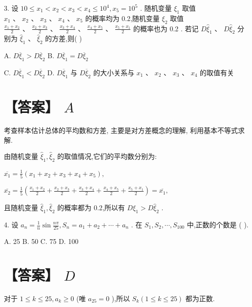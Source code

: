 \documentclass[10pt]{article}
\begin{document}
3. 设 \({10} \leq  {x}_{1} < {x}_{2} < {x}_{3} < {x}_{4} \leq  {10}^{4},{x}_{5} = {10}^{5}\) . 随机变量 \({\xi }_{1}\) 取值 \({x}_{1}\text{ 、 }{x}_{2}\text{ 、 }{x}_{3}\text{ 、 }{x}_{4}\text{ 、 }{x}_{5}\) 的概率均为 0.2,随机变量 \({\xi }_{2}\) 取值 \(\frac{{x}_{1} + {x}_{2}}{2}\text{ 、 }\frac{{x}_{2} + {x}_{3}}{2}\text{ 、 }\frac{{x}_{3} + {x}_{4}}{2}\text{ 、 }\frac{{x}_{4} + {x}_{5}}{2}\text{ 、 }\frac{{x}_{5} + {x}_{1}}{2}\) 的概率也为 0.2 . 若记 \(D{\widehat{\xi }}_{1}\text{ 、 }D{\widehat{\xi }}_{2}\) 分别为 \({\widehat{\xi }}_{1}\text{ 、 }{\widehat{\xi }}_{2}\) 的方差,则(   )

A. \(D{\overline{\xi }}_{1} > D{\overline{\xi }}_{2}\) B. \(D{\overline{\xi }}_{1} = D{\overline{\xi }}_{2}\)

C. \(D{\overline{\xi }}_{1} < D{\overline{\xi }}_{2}\) D. \(D{\overline{\xi }}_{1}\) 与 \(D{\overline{\xi }}_{2}\) 的大小关系与 \({x}_{1}\text{ 、 }{x}_{2}\text{ 、 }{x}_{3}\text{ 、 }{x}_{4}\) 的取值有关

\section*{【答案】 \(A\)}

考查样本估计总体的平均数和方差, 主要是对方差概念的理解, 利用基本不等式求解.

由随机变量 \({\widehat{\xi }}_{1},{\widehat{\xi }}_{2}\) 的取值情况,它们的平均数分别为:

\(\overline{{x}_{1}} = \frac{1}{5}\left( {{x}_{1} + {x}_{2} + {x}_{3} + {x}_{4} + {x}_{5}}\right) ,\)

\(\overline{{x}_{2}} = \frac{1}{5}\left( {\frac{{x}_{1} + {x}_{2}}{2} + \frac{{x}_{2} + {x}_{3}}{2} + \frac{{x}_{3} + {x}_{4}}{2} + \frac{{x}_{4} + {x}_{5}}{2} + \frac{{x}_{5} + {x}_{1}}{2}}\right)  = \overline{{x}_{1}},\)

且随机变量 \({\widehat{\xi }}_{1},{\widehat{\xi }}_{2}\) 的概率都为 0.2,所以有 \(D{\widehat{\xi }}_{1} > D{\widehat{\xi }}_{2}\) .

4. 设 \({a}_{n} = \frac{1}{n}\sin \frac{n\pi }{25},{S}_{n} = {a}_{1} + {a}_{2} + \cdots  + {a}_{n}\) . 在 \({S}_{1},{S}_{2},\cdots ,{S}_{100}\) 中,正数的个数是 ( ).

A. 25 B. 50 C. 75 D. 100

\section*{【答案】 \(D\)}

对于 \(1 \leq  k \leq  {25},{a}_{k} \geq  0\) (唯 \({a}_{25} = 0\) ),所以 \({S}_{k}\left( {1 \leq  k \leq  {25}}\right)\) 都为正数.
\end{document}
